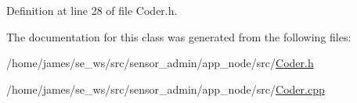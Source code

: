 Definition at line 28 of file Coder.\-h.



The documentation for this class was generated from the following files\-:\begin{DoxyCompactItemize}
\item 
/home/james/se\-\_\-ws/src/sensor\-\_\-admin/app\-\_\-node/src/\hyperlink{app__node_2src_2_coder_8h}{Coder.\-h}\item 
/home/james/se\-\_\-ws/src/sensor\-\_\-admin/app\-\_\-node/src/\hyperlink{app__node_2src_2_coder_8cpp}{Coder.\-cpp}\end{DoxyCompactItemize}
